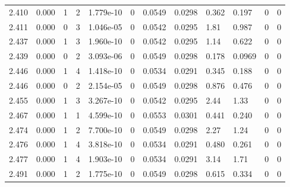\documentclass[preview]{standalone}
\begin{document}
{{{{\begin{tabular}{L{1.2cm}C{1.2cm} C{0.3cm}C{0.5cm} C{1.4cm}C{1.4cm} C{1.4cm}C{1.4cm} C{1.6cm}C{1.6cm} C{1.6cm}C{1.6cm}}
  2.410  &  0.000  & 1     &  2 &  1.779e-10  & 0  &  0.0549&   0.0298& 0.362 & 0.197   &  0 & 0  \\ 
  2.411  &  0.000  & 0     &  3 &  1.046e-05  & 0  &  0.0542&   0.0295& 1.81 & 0.987   &  0 & 0  \\ 
  2.437  &  0.000  & 1     &  3 &  1.960e-10  & 0  &  0.0542&   0.0295& 1.14 & 0.622   &  0 & 0  \\ 
  2.439  &  0.000  & 0     &  2 &  3.093e-06  & 0  &  0.0549&   0.0298& 0.178 & 0.0969   &  0 & 0  \\ 
  2.446  &  0.000  & 1     &  4 &  1.418e-10  & 0  &  0.0534&   0.0291& 0.345 & 0.188   &  0 & 0  \\ 
  2.446  &  0.000  & 0     &  2 &  2.154e-05  & 0  &  0.0549&   0.0298& 0.876 & 0.476   &  0 & 0  \\ 
  2.455  &  0.000  & 1     &  3 &  3.267e-10  & 0  &  0.0542&   0.0295& 2.44 & 1.33   &  0 & 0  \\ 
  2.467  &  0.000  & 1     &  1 &  4.599e-10  & 0  &  0.0553&   0.0301& 0.441 & 0.240   &  0 & 0  \\ 
  2.474  &  0.000  & 1     &  2 &  7.700e-10  & 0  &  0.0549&   0.0298& 2.27 & 1.24   &  0 & 0  \\ 
  2.476  &  0.000  & 1     &  4 &  3.818e-10  & 0  &  0.0534&   0.0291& 0.480 & 0.261   &  0 & 0  \\ 
  2.477  &  0.000  & 1     &  4 &  1.903e-10  & 0  &  0.0534&   0.0291& 3.14 & 1.71   &  0 & 0  \\ 
  2.491  &  0.000  & 1     &  2 &  1.775e-10  & 0  &  0.0549&   0.0298& 0.615 & 0.334   &  0 & 0  \\ 
\hline 
\end{tabular} 

}}}}
\end{document}
